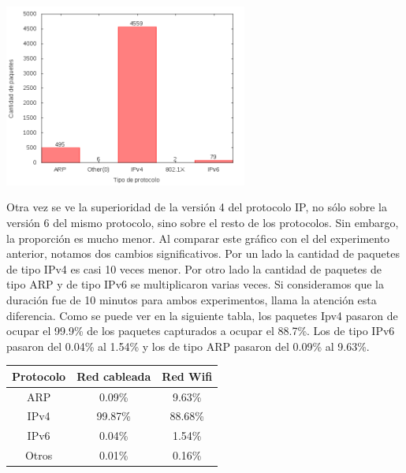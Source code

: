 \begin{center}
\includegraphics[width=8cm]{../mediciones/home-wfi-10/home-wfi-10Protocolos.png}
\end{center}

Otra vez se ve la superioridad de la versión 4 del protocolo IP, no sólo sobre la versión 6 del mismo protocolo, sino sobre el resto de los protocolos.
Sin embargo, la proporción es mucho menor. Al comparar este gráfico con el del experimento anterior, notamos dos cambios significativos. Por un lado la cantidad
de paquetes de tipo IPv4 es casi 10 veces menor. Por otro lado la cantidad de paquetes de tipo ARP y de tipo IPv6 se multiplicaron varias veces. Si consideramos
que la duración fue de 10 minutos para ambos experimentos, llama la atención esta diferencia. Como se puede ver en la siguiente tabla, los paquetes Ipv4 pasaron
de ocupar el 99.9\% de los paquetes capturados a ocupar el 88.7\%. Los de tipo IPv6 pasaron del 0.04\% al 1.54\% y los de tipo ARP pasaron del 0.09\% al 9.63\%.

\begin{center}
\begin{tabular}{|c||c|c|}
\hline
Protocolo & Red cableada & Red Wifi \\
\hline
ARP & 0.09\% & 9.63\% \\
\hline
IPv4 & 99.87\% & 88.68\% \\
\hline
IPv6 & 0.04\% & 1.54\% \\
\hline
Otros & 0.01\% & 0.16\% \\
\hline
\end{tabular}
\end{center}


